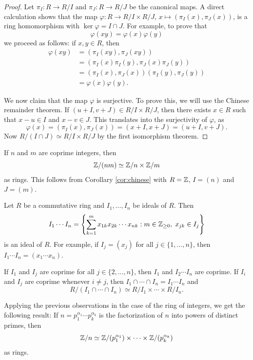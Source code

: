 \begin{proof}
	Let $\pi_I\colon R\to R/I$ and $\pi_J\colon R\to R/J$ be the canonical maps. A direct 
	calculation shows that the
	map $\varphi\colon R\to R/I\times R/J$, $x\mapsto (\pi_I(x),\pi_J(x))$, 
	is a ring homomorphism with $\ker\varphi=I\cap J$. For example, to prove
 that 
 \[
 \varphi(xy)=\varphi(x)\varphi(y)
 \]
 we proceed as follows: if $x,y\in R$, then 
        \begin{align*}
            \varphi(xy) &= (\pi_I(xy),\pi_J(xy))\\
            &= (\pi_I(x)\pi_I(y),\pi_J(x)\pi_J(y))\\
            &= (\pi_I(x),\pi_J(x))(\pi_I(y),\pi_J(y))\\
            &= \varphi(x)\varphi(y). 
        \end{align*}

 We now claim that the map $\varphi$ is surjective. To prove this, 
 we will use the Chinese remainder theorem. If $(u+I,v+J)\in R/I\times R/J$, 
	then there exists $x\in R$ such that 
	$x-u\in I$ and $x-v\in J$. This translates into the surjectivity of $\varphi$,
 as \[
 \varphi(x)=(\pi_I(x),\pi_J(x))=(x+I,x+J)=(u+I,v+J).
 \]
 Now
	$R/(I\cap J)\simeq R/I\times R/J$ by the first isomorphism theorem. 
\end{proof}

\begin{example}
    If $n$ and $m$ are coprime integers, then
    \[
    \mathbb{Z}/(nm)\simeq \mathbb{Z}/n\times \mathbb{Z}/m
    \]
    as rings. This follows from Corollary \ref{cor:chinese} with 
    $R=\mathbb{Z}$, $I=(n)$ and $J=(m)$. 
\end{example}

Let $R$ be a commutative ring and $I_1,\dots,I_n$ be ideals of $R$. Then
\[
I_1\cdots I_n=
\left\{
\sum_{k=1}^m
x_{1k}x_{2k}\cdots x_{nk}
:
m\in\mathbb{Z}_{\geq0},\;
x_{jk}\in I_j
\right\}
\]
is an ideal of $R$. For example, if $I_j=(x_j)$ for all $j\in\{1,\dots,n\}$, 
then $I_1\cdots I_n=(x_1\cdots x_n)$. 

If $I_1$ and $I_j$ are coprime for all $j\in\{2,\dots,n\}$, 
then $I_1$ and $I_2\cdots I_n$ are coprime. If $I_i$ and $I_j$ are coprime
whenever $i\ne j$, then 
$I_1\cap\cdots\cap I_n=I_1\cdots I_n$ and 
\[
R/(I_1\cap\cdots\cap I_n)\simeq R/I_1\times\cdots\times R/I_n.
\]

Applying the previous observations in the case of the ring of integers, we get the following result: If $n=p_1^{\alpha_1}\cdots p_k^{\alpha_k}$ is the factorization 
of $n$ into powers of distinct primes, then 
\[
\mathbb{Z}/n\simeq \mathbb{Z}/(p_1^{\alpha_1})\times\cdots \times \mathbb{Z}/(p_k^{\alpha_k})
\]
as rings. 

